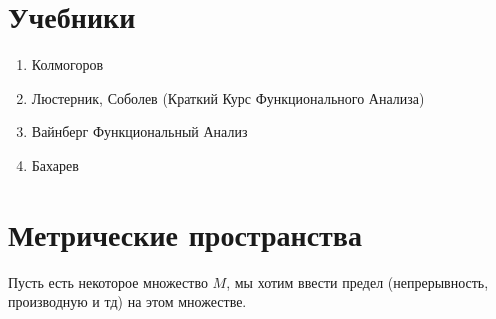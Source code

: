 \documentclass[14pt]{extarticle}
\title{}
\author{}
\date{}
\begin{document}
\maketitle
\section{Учебники}
\begin{enumerate}
	\item Колмогоров
	\item Люстерник, Соболев (Краткий Курс Функционального Анализа)
	\item Вайнберг Функциональный Анализ
	\item Бахарев
\end{enumerate}
\section{Метрические пространства}
Пусть есть некоторое множество $M$,
мы хотим ввести предел (непрерывность, производную  и тд) на этом множестве.
\end{document}
